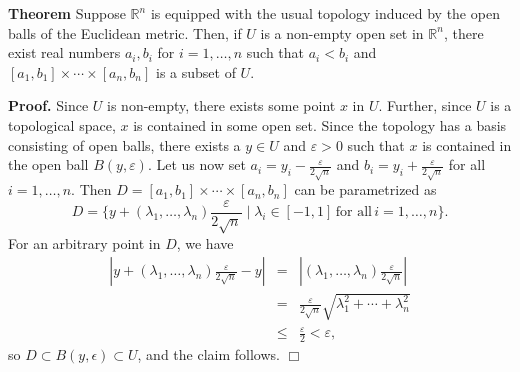 \documentclass[12pt]{article}
\newcommand{\sR}[0]{\mathbb{R}}
\begin{document}
{\bf Theorem} Suppose $\sR^n$ is
 equipped with the usual topology induced by the open balls of the
 Euclidean metric.
 Then, if $U$ is a non-empty open set in $\sR^n$, there
 exist real numbers $a_i, b_i$ for $i=1,\ldots, n$ such that
 $a_i<b_i$ and $[a_1,b_1]\times \cdots \times [a_n, b_n]$ is a subset of $U$.
 
 {\bf Proof.} 
 Since $U$ is non-empty, there exists some point $x$
 in $U$. Further, since $U$ is a topological space, $x$ is contained in
 some open set. Since the topology has a basis consisting of
 open balls, there exists a $y\in U$ and $\varepsilon >0$ such that $x$
 is contained in the open ball $B(y,\varepsilon)$.
 Let us now set $a_i=y_i - \frac{\varepsilon}{2\sqrt{n}}$ and
 $b_i=y_i + \frac{\varepsilon}{2\sqrt{n}}$
 for all $i=1,\ldots, n$.
 Then $D=[a_1,b_1]\times \cdots \times [a_n, b_n]$ can be
 parametrized as
 $$D=\{y+(\lambda_1,\ldots, \lambda_n) \frac{\varepsilon}{2\sqrt{n}} \mid \lambda_i\in[-1,1]\,\mbox{for all}\, i=1,\ldots, n\}.$$
 For an arbitrary point in $D$, we have
 \begin{eqnarray*}
 |y+(\lambda_1,\ldots, \lambda_n) \frac{\varepsilon}{2\sqrt{n}}-y| &=& |(\lambda_1,\ldots, \lambda_n) \frac{\varepsilon}{2\sqrt{n}}| \\
 &=& \frac{\varepsilon}{2\sqrt{n}} \sqrt{\lambda_1^2 + \cdots + \lambda_n^2} \\
 &\le& \frac{\varepsilon}{2} < \varepsilon,
 \end{eqnarray*}
 so $D\subset B(y,\epsilon)\subset U$, and the claim follows. $\Box$
\end{document}
